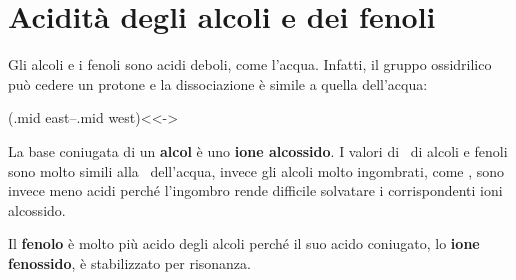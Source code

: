 \section{Acidità degli alcoli e dei fenoli}\label{sec:aciditaAlcol}
Gli alcoli e i fenoli sono acidi deboli, come l'acqua. Infatti, il gruppo ossidrilico può cedere un protone e la dissociazione è simile a quella dell'acqua:

\begingroup
\chemnameinit{}
\begin{reaction}
	 \arrow(.mid east--.mid west){<<->}
	 \+{1em,1em} 
\end{reaction}
\chemnameinit{}
\endgroup

La base coniugata di un \textbf{alcol} è uno \textbf{ione alcossido}. I valori di \pKa\ di alcoli e fenoli sono molto simili alla \pKa\ dell'acqua, invece gli alcoli molto ingombrati, come , sono invece meno acidi perché l'ingombro rende difficile solvatare i corrispondenti ioni alcossido.

Il \textbf{fenolo} è molto più acido degli alcoli perché il suo acido coniugato, lo \textbf{ione fenossido}, è stabilizzato per risonanza.

